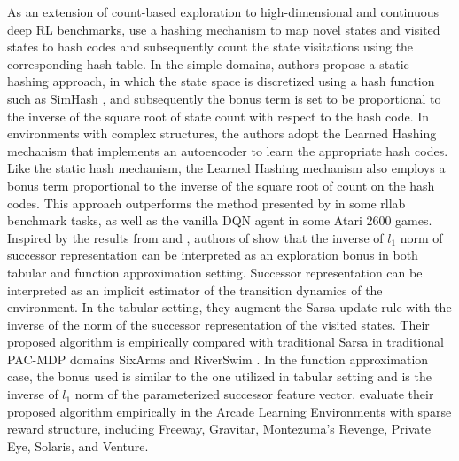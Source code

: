 As an extension of count-based exploration to high-dimensional and continuous deep RL benchmarks,  use a hashing mechanism to map novel states and visited states to hash codes and subsequently count the state visitations using the corresponding hash table. In the simple domains, authors propose a static hashing approach, in which the state space is discretized using a hash function such as SimHash , and subsequently the bonus term is set to be proportional to the inverse of the square root of state count with respect to the hash code. In environments with complex structures, the authors adopt the Learned Hashing mechanism that implements an autoencoder to learn the appropriate hash codes. Like the static hash mechanism, the Learned Hashing mechanism also employs a bonus term proportional to the inverse of the square root of count on the hash codes. This approach outperforms the method presented by   in some  rllab benchmark tasks, as well as the vanilla DQN agent in some Atari 2600 games. 
Inspired by the results from  and , authors of  show that the inverse of $l_1$ norm of successor representation  can be interpreted as an exploration bonus in both tabular and function approximation setting. Successor representation  can be interpreted as an implicit estimator of the transition dynamics of the environment. In the tabular setting, they augment the Sarsa  update rule with the inverse of the norm of the successor representation of the visited states. Their proposed algorithm is empirically compared with traditional Sarsa in traditional PAC-MDP domains SixArms and RiverSwim . In the function approximation case, the bonus used is similar to the one utilized in tabular setting and is the inverse of $l_1$ norm of the parameterized successor feature vector.  evaluate their proposed algorithm empirically in the Arcade Learning Environments  with sparse reward structure, including Freeway, Gravitar, Montezuma's Revenge, Private Eye, Solaris, and Venture.

